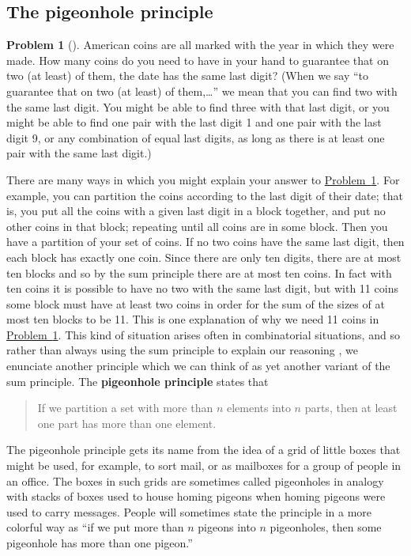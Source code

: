 \documentclass[10pt,]{book}
\newcommand{\terminology}[1]{\textbf{#1}}
\theoremstyle{plain}
\theoremstyle{definition}
\newtheorem{activity}[project]{Problem}
\theoremstyle{definition}
\numberwithin{equation}{chapter}
\begin{document}
\subsection[{The pigeonhole principle}]{The pigeonhole principle}\label{subsection-9}
\begin{activity}[] \label{elevencoins}
American coins are all marked with the year in which they were made. How many coins do you need to have in your hand to guarantee that on two (at least) of them, the date has the same last digit? (When we say ``to guarantee that on two (at least) of them,\dots{}'' we mean that you can find two with the same last digit. You might be able to find three with that last digit, or you might be able to find one pair with the last digit 1 and one pair with the last digit 9, or any combination of equal last digits, as long as there is at least one pair with the same last digit.)%
\end{activity}
There are many ways in which you might explain your answer to \hyperref[elevencoins]{Problem~\ref{elevencoins}}. For example, you can partition the coins according to the last digit of their date; that is, you put all the coins with a given last digit in a block together, and put no other coins in that block; repeating until all coins are in some block. Then you have a partition of your set of coins. If no two coins have the same last digit, then each block has exactly one coin. Since there are only ten digits, there are at most ten blocks and so by the sum principle there are at most ten coins. In fact with ten coins it is possible to have no two with the same last digit, but with 11 coins some block must have at least two coins in order for the sum of the sizes of at most ten blocks to be 11. This is one explanation of why we need 11 coins in \hyperref[elevencoins]{Problem~\ref{elevencoins}}. This kind of situation arises often in combinatorial situations, and so rather than always using the sum principle to explain our reasoning , we enunciate another principle which we can think of as yet another variant of the sum principle. The \terminology{pigeonhole principle} states that%
\begin{quote}\hypertarget{blockquote-5}{}
If we partition a set with more than \(n\) elements into \(n\) parts, then at least one part has more than one element.%
\end{quote}
The pigeonhole principle gets its name from the idea of a grid of little boxes that might be used, for example, to sort mail, or as mailboxes for a group of people in an office. The boxes in such grids are sometimes called pigeonholes in analogy with stacks of boxes used to house homing pigeons when homing pigeons were used to carry messages. People will sometimes state the principle in a more colorful way as ``if we put more than \(n\) pigeons into \(n\) pigeonholes, then some pigeonhole has more than one pigeon.''%
\end{document}
